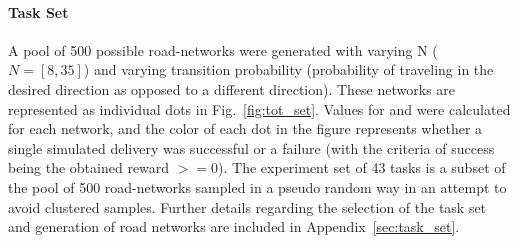     \noindent \paragraph{Task Set}
    A pool of 500 possible road-networks were generated with varying N ($N=[8,35]$) and varying transition probability (probability of traveling in the desired direction as opposed to a different direction). These networks are represented as individual dots in Fig.~\ref{fig:tot_set}. Values for \xQ{} and \xO{} were calculated for each network, and the color of each dot in the figure represents whether a single simulated delivery was successful or a failure (with the criteria of success being the obtained reward $ >= 0$). The experiment set of 43 tasks is a subset of the pool of 500 road-networks sampled in a pseudo random way in an attempt to avoid clustered samples. Further details regarding the selection of the task set and generation of road networks are included in Appendix~\ref{sec:task_set}.

